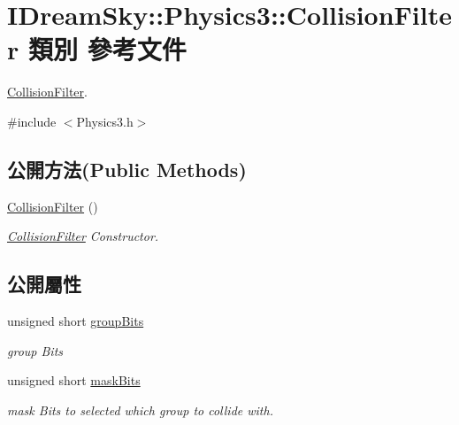 \hypertarget{class_i_dream_sky_1_1_physics3_1_1_collision_filter}{}\section{I\+Dream\+Sky\+:\+:Physics3\+:\+:Collision\+Filter 類別 參考文件}
\label{class_i_dream_sky_1_1_physics3_1_1_collision_filter}


\hyperlink{class_i_dream_sky_1_1_physics3_1_1_collision_filter}{Collision\+Filter}.  




{\ttfamily \#include $<$Physics3.\+h$>$}

\subsection*{公開方法(Public Methods)}
\begin{DoxyCompactItemize}
\item 
\hyperlink{class_i_dream_sky_1_1_physics3_1_1_collision_filter_a5cabe8db1c20e0ddf7a1c0cf002f37a9}{Collision\+Filter} ()
\begin{DoxyCompactList}\small\item\em \hyperlink{class_i_dream_sky_1_1_physics3_1_1_collision_filter}{Collision\+Filter} Constructor. \end{DoxyCompactList}\end{DoxyCompactItemize}
\subsection*{公開屬性}
\begin{DoxyCompactItemize}
\item 
unsigned short \hyperlink{class_i_dream_sky_1_1_physics3_1_1_collision_filter_afc9afd98d94d2f10b5cb7556eb968aaa}{group\+Bits}\hypertarget{class_i_dream_sky_1_1_physics3_1_1_collision_filter_afc9afd98d94d2f10b5cb7556eb968aaa}{}\label{class_i_dream_sky_1_1_physics3_1_1_collision_filter_afc9afd98d94d2f10b5cb7556eb968aaa}

\begin{DoxyCompactList}\small\item\em group Bits \end{DoxyCompactList}\item 
unsigned short \hyperlink{class_i_dream_sky_1_1_physics3_1_1_collision_filter_acab5a0f314b49ee6c8fc1b57d8d333da}{mask\+Bits}
\begin{DoxyCompactList}\small\item\em mask Bits to selected which group to collide with. \end{DoxyCompactList}\end{DoxyCompactItemize}



